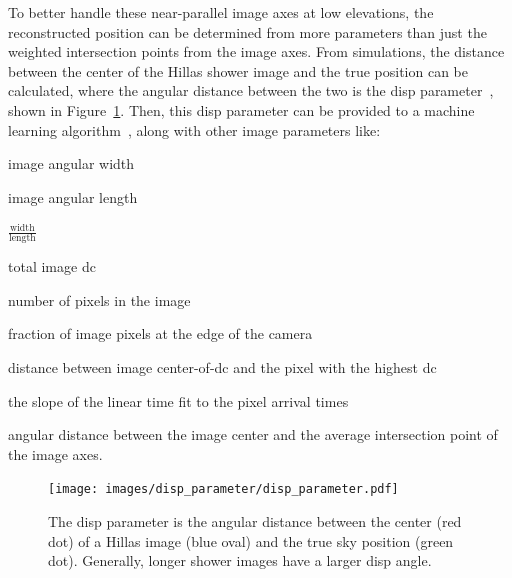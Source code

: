     To better handle these near-parallel image axes at low elevations, the reconstructed position can be determined from more parameters than just the weighted intersection points from the image axes.
    From simulations, the distance between the center of the Hillas shower image and the true position can be calculated, where the angular distance between the two is the disp parameter~\cite{Senturk:2011}, shown in Figure~\ref{fig:dispdiagram}.
    Then, this disp parameter can be provided to a machine learning algorithm~\cite{Beilicke2012NIM}, along with other image parameters like:
    \begin{description}[noitemsep]
      \item [width:] image angular width
      \item [length:] image angular length
      \item [wol:] $\frac{\textrm{width}}{\textrm{length}}$
      \item [size:] total image dc
      \item [ntubes:] number of pixels in the image
      \item [loss:] fraction of image pixels at the edge of the camera
      \item [asym:] distance between image center-of-dc and the pixel with the highest dc
      \item [tgrad:] the slope of the linear time fit to the pixel arrival times
      \item [cross:] angular distance between the image center and the average intersection point of the image axes.
    \end{description}


    \begin{figure}[t]
      \centering
      \texttt{[image: images/disp\_parameter/disp\_parameter.pdf]}
      \caption[Angular Reconstruction Disp]{
        The disp parameter is the angular distance between the center (red dot) of a Hillas image (blue oval) and the true sky position (green dot).
        Generally, longer shower images have a larger disp angle.
      }
      \label{fig:dispdiagram}
    \end{figure}

